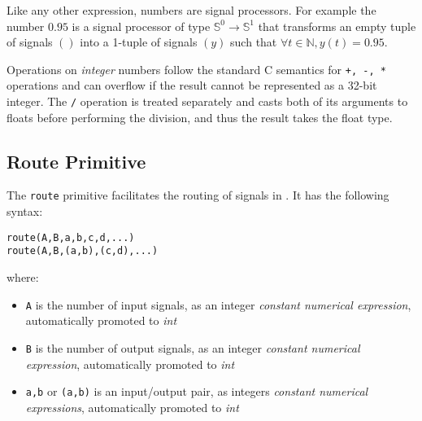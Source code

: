 Like any other \faust expression, numbers are signal processors. For example the number $0.95$ is a signal processor of type $\mathbb{S}^{0}\rightarrow\mathbb{S}^{1}$ that transforms an empty tuple of signals $()$ into a 1-tuple of signals $(y)$ such that $\forall t\in\mathbb{N}, y(t)=0.95$.

Operations on \textit{integer} numbers follow the standard C semantics for \lstinline'+, -, *' operations and can overflow if the result cannot be represented as a 32-bit integer. The \lstinline'/' operation is treated separately and casts both of its arguments to floats before performing the division, and thus the result takes the float type.



\subsection{Route Primitive }

The  \lstinline'route' primitive facilitates the routing of signals in \faust. It has the following syntax:

\begin{lstlisting}
route(A,B,a,b,c,d,...)
route(A,B,(a,b),(c,d),...)
\end{lstlisting}

where:

\begin{itemize}
	\item \lstinline'A' is the number of input signals, as an integer \textit{constant numerical expression}, automatically promoted to \textit{int}
	\item \lstinline'B' is the number of output signals, as an integer \textit{constant numerical expression}, automatically promoted to \textit{int}
	\item \lstinline'a,b' or \lstinline'(a,b)' is an input/output pair, as integers \textit{constant numerical expressions}, automatically promoted to \textit{int}
\end{itemize}

